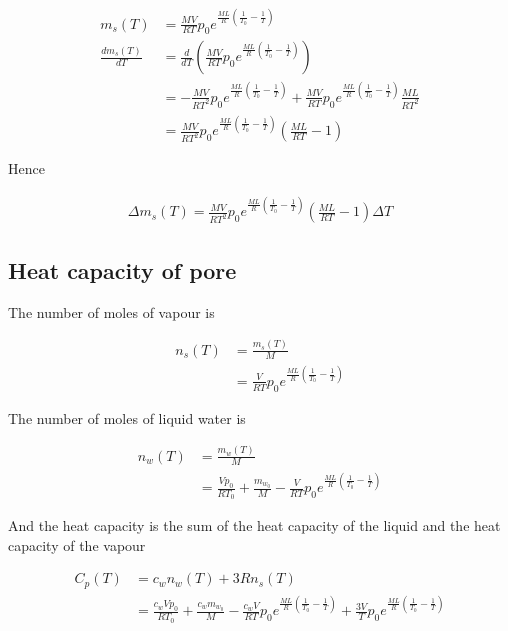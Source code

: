 \documentclass{article}
\begin{document}
\begin{align*}
m_s(T) &= \frac{MV}{RT}p_0 e^{\frac{ML}{R}\left(\frac{1}{T_0} - \frac{1}{T}\right)} \\
\frac{d m_s(T)}{dT} &= \frac{d}{dT} \left(\frac{MV}{RT}p_0 e^{\frac{ML}{R}\left(\frac{1}{T_0} - \frac{1}{T}\right)}\right) \\
&= -\frac{MV}{RT^2}p_0 e^{\frac{ML}{R}\left(\frac{1}{T_0} - \frac{1}{T}\right)} + \frac{MV}{RT}p_0 e^{\frac{ML}{R}\left(\frac{1}{T_0} - \frac{1}{T}\right)}\frac{ML}{RT^2} \\
&= \frac{MV}{RT^2}p_0 e^{\frac{ML}{R}\left(\frac{1}{T_0} - \frac{1}{T}\right)} \left(\frac{ML}{RT} - 1\right)
\end{align*}

Hence

\begin{align*}
\Delta m_s(T) = \frac{MV}{RT^2}p_0 e^{\frac{ML}{R}\left(\frac{1}{T_0} - \frac{1}{T}\right)} \left(\frac{ML}{RT} - 1\right) \Delta T
\end{align*}

\subsection{Heat capacity of pore}

The number of moles of vapour is

\begin{align*}
n_s(T) &= \frac{m_s(T)}{M} \\
&= \frac{V}{RT}p_0 e^{\frac{ML}{R}\left(\frac{1}{T_0} - \frac{1}{T}\right)}
\end{align*}

The number of moles of liquid water is

\begin{align*}
n_w(T) &= \frac{m_w(T)}{M} \\
&= \frac{Vp_0}{RT_0} + \frac{m_{w_0}}{M} - \frac{V}{RT}p_0 e^{\frac{ML}{R}\left(\frac{1}{T_0} - \frac{1}{T}\right)}
\end{align*}

And the heat capacity is the sum of the heat capacity of the liquid and the heat capacity of the vapour

\begin{align*}
C_p(T) &= c_w n_w(T) + 3R n_s(T) \\
&= \frac{c_wVp_0}{RT_0} + \frac{c_w m_{w_0}}{M} - \frac{c_w V}{RT}p_0 e^{\frac{ML}{R}\left(\frac{1}{T_0} - \frac{1}{T}\right)} + \frac{3V}{T}p_0 e^{\frac{ML}{R}\left(\frac{1}{T_0} - \frac{1}{T}\right)}
\end{align*}
\end{document}
